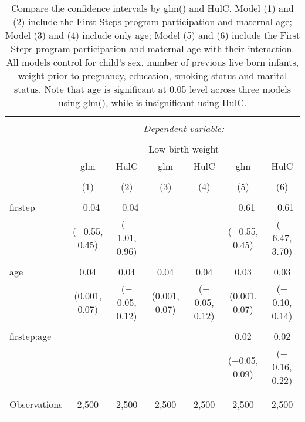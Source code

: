 
\begin{table}[!htbp] \centering 
  \caption{Compare the confidence intervals by glm() and HulC. Model (1) and (2) include the First Steps program participation and maternal age; Model (3) and (4) include only age; Model (5) and (6) include the First Steps program participation and maternal age with their interaction. All models control for child’s sex, number of previous live born infants, weight prior to pregnancy, education, smoking status and marital status. Note that age is significant at 0.05 level across three models using glm(), while is insignificant using HulC.} 
  \label{tbl:glm-ci} 
\begin{tabular}{@{\extracolsep{-10pt}}lcccccc} 
\\[-1.8ex]\hline 
\hline \\[-1.8ex] 
 & \multicolumn{6}{c}{\textit{Dependent variable:}} \\ 
\cline{2-7} 
\\[-1.8ex] & \multicolumn{6}{c}{Low birth weight} \\ 
 & glm & HulC & glm & HulC & glm & HulC \\ 
\\[-1.8ex] & (1) & (2) & (3) & (4) & (5) & (6)\\ 
\hline \\[-1.8ex] 
 firstep & $-$0.04 & $-$0.04 &  &  & $-$0.61 & $-$0.61 \\ 
  & ($-$0.55, 0.45) & ($-$1.01, 0.96) &  &  & ($-$0.55, 0.45) & ($-$6.47, 3.70) \\ 
  & & & & & & \\ 
 age & 0.04 & 0.04 & 0.04 & 0.04 & 0.03 & 0.03 \\ 
  & (0.001, 0.07) & ($-$0.05, 0.12) & (0.001, 0.07) & ($-$0.05, 0.12) & (0.001, 0.07) & ($-$0.10, 0.14) \\ 
  & & & & & & \\ 
 firstep:age &  &  &  &  & 0.02 & 0.02 \\ 
  &  &  &  &  & ($-$0.05, 0.09) & ($-$0.16, 0.22) \\ 
  & & & & & & \\ 
\hline \\[-1.8ex] 
Observations & 2,500 & 2,500 & 2,500 & 2,500 & 2,500 & 2,500 \\ 
\hline 
\hline \\[-1.8ex] 
\end{tabular} 
\end{table} 
